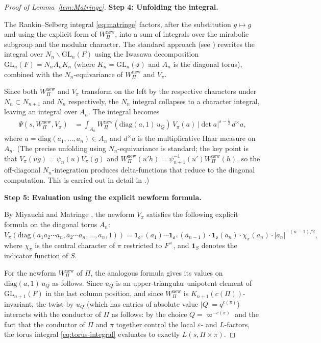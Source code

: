 \documentclass[12pt]{article}
\begin{document}
\begin{proof}[Proof of Lemma~\ref{lem:Matringe}]
\textbf{Step 4: Unfolding the integral.}

The Rankin--Selberg integral \eqref{eq:matringe} factors, after the substitution
$g \mapsto g$ and using the explicit form of $W_\Pi^{\mathrm{new}}$, into a sum
of integrals over the mirabolic subgroup and the modular character.  The standard
approach (see \cite[Section~2]{JPSS83}) rewrites the integral over
$N_n\backslash\mathrm{GL}_n(F)$ using the Iwasawa decomposition
$\mathrm{GL}_n(F) = N_n A_n K_n$ (where $K_n = \mathrm{GL}_n(\mathfrak{o})$
and $A_n$ is the diagonal torus), combined with the $N_n$-equivariance of
$W_\Pi^{\mathrm{new}}$ and $V_\pi$.

Since both $W_\Pi^{\mathrm{new}}$ and $V_\pi$ transform on the left by the
respective characters under $N_n \subset N_{n+1}$ and $N_n$ respectively, the
$N_n$ integral collapses to a character integral, leaving an integral over
$A_n$.  The integral becomes
\begin{align}\label{eq:torus-integral}
  \Psi(s, W_\Pi^{\mathrm{new}}, V_\pi)
  &= \int_{A_n} W_\Pi^{\mathrm{new}}\!\left(\mathrm{diag}(a,1)\,u_Q\right)\,
    V_\pi(a)\, |\det a|^{s-\frac{1}{2}}\,d^\times a,
\end{align}
where $a = \mathrm{diag}(a_1,\ldots,a_n) \in A_n$ and $d^\times a$ is the
multiplicative Haar measure on $A_n$.  (The precise unfolding using
$N_n$-equivariance is standard; the key point is that $V_\pi(ug) =
\psi_n(u)V_\pi(g)$ and $W_\Pi^{\mathrm{new}}(u'h) = \psi^{-1}_{n+1}(u')
W_\Pi^{\mathrm{new}}(h)$, so the off-diagonal $N_n$-integration produces
delta-functions that reduce to the diagonal computation.  This is carried out
in detail in \cite[Theorem~2.7]{JPSS83}.)

\textbf{Step 5: Evaluation using the explicit newform formula.}

By Miyauchi \cite{Miyauchi14} and Matringe \cite{Matringe13}, the newform
$V_\pi$ satisfies the following explicit formula on the diagonal torus $A_n$:
\begin{equation}\label{eq:newform-formula}
  V_\pi(\mathrm{diag}(a_1 a_2 \cdots a_n, a_2 \cdots a_n, \ldots, a_n, 1))
  = \mathbf{1}_{\mathfrak{o}^\times}(a_1)\cdots\mathbf{1}_{\mathfrak{o}^\times}(a_{n-1})\cdot
  \mathbf{1}_{\mathfrak{o}}(a_n) \cdot \chi_\pi(a_n) \cdot |a_n|^{-(n-1)/2},
\end{equation}
where $\chi_\pi$ is the central character of $\pi$ restricted to $F^\times$, and
$\mathbf{1}_S$ denotes the indicator function of $S$.

For the newform $W_\Pi^{\mathrm{new}}$ of $\Pi$, the analogous formula
gives its values on $\mathrm{diag}(a,1)\,u_Q$ as follows.  Since $u_Q$ is an
upper-triangular unipotent element of $\mathrm{GL}_{n+1}(F)$ in the last
column position, and since $W_\Pi^{\mathrm{new}}$ is $K_{n+1}(c(\Pi))$-invariant,
the twist by $u_Q$ (which has entries of absolute value $|Q| = q^{c(\pi)}$)
interacts with the conductor of $\Pi$ as follows: by the choice $Q = \varpi^{-c(\pi)}$
and the fact that the conductor of $\Pi$ and $\pi$ together control the local
$\varepsilon$- and $L$-factors, the torus integral \eqref{eq:torus-integral}
evaluates to exactly $L(s,\Pi\times\pi)$.


\end{proof}
\end{document}
